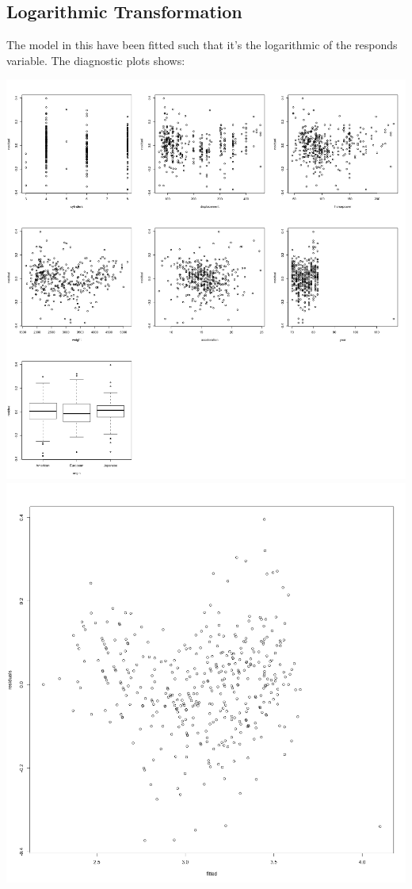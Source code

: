 \documentclass[11pt]{article} %
\begin{document}
\subsection{Logarithmic Transformation}
The model in this have been fitted such that it's the logarithmic of the responds variable. The diagnostic plots shows:
\begin{center}
\includegraphics[scale=0.13]{3_res_vs_value}
\includegraphics[scale=0.13]{3_res_vs_fitted}
\end{center}
\end{document}
